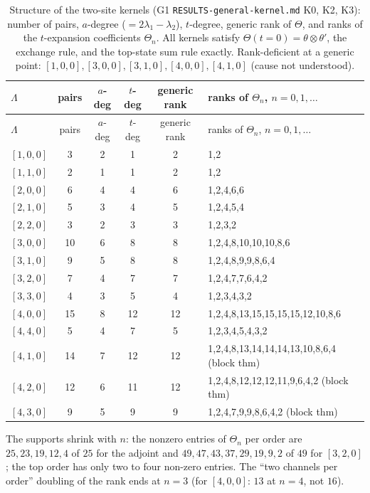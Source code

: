\documentclass[11pt]{article}
\begin{document}
{\footnotesize
\begin{longtable}{lccccl}
\caption{Structure of the two-site kernels (G1 \texttt{RESULTS-\allowbreak{}general-\allowbreak{}kernel.\allowbreak{}md} K0, K2, K3): number of pairs, $a$-degree ($=2\lambda_1-\lambda_2$), $t$-degree, generic rank of $\Theta$, and ranks of the $t$-expansion coefficients $\Theta_n$. All kernels satisfy $\Theta(t=0)=\theta\otimes\theta'$, the exchange rule, and the top-state sum rule exactly.
Rank-deficient at a generic point: $[1,0,0],[3,0,0],[3,1,0],[4,0,0],[4,1,0]$ (cause not understood).}\label{tab:kstruct}\\
\toprule
$\Lambda$ & pairs & $a$-deg & $t$-deg & generic rank & ranks of $\Theta_n$, $n=0,1,\dots$ \\
\midrule
\endfirsthead
\toprule
$\Lambda$ & pairs & $a$-deg & $t$-deg & generic rank & ranks of $\Theta_n$, $n=0,1,\dots$ \\
\midrule
\endhead
\bottomrule
\endlastfoot
$[1,0,0]$ & 3 & 2 & 1 & 2 & 1,2 \\
$[1,1,0]$ & 2 & 1 & 1 & 2 & 1,2 \\
$[2,0,0]$ & 6 & 4 & 4 & 6 & 1,2,4,6,6 \\
$[2,1,0]$ & 5 & 3 & 4 & 5 & 1,2,4,5,4 \\
$[2,2,0]$ & 3 & 2 & 3 & 3 & 1,2,3,2 \\
$[3,0,0]$ & 10 & 6 & 8 & 8 & 1,2,4,8,10,10,10,8,6 \\
$[3,1,0]$ & 9 & 5 & 8 & 8 & 1,2,4,8,9,9,8,6,4 \\
$[3,2,0]$ & 7 & 4 & 7 & 7 & 1,2,4,7,7,6,4,2 \\
$[3,3,0]$ & 4 & 3 & 5 & 4 & 1,2,3,4,3,2 \\
$[4,0,0]$ & 15 & 8 & 12 & 12 & 1,2,4,8,13,15,15,15,15,12,10,8,6 \\
$[4,4,0]$ & 5 & 4 & 7 & 5 & 1,2,3,4,5,4,3,2 \\
$[4,1,0]$ & 14 & 7 & 12 & 12 & 1,2,4,8,13,14,14,14,13,10,8,6,4 (block thm) \\
$[4,2,0]$ & 12 & 6 & 11 & 12 & 1,2,4,8,12,12,12,11,9,6,4,2 (block thm) \\
$[4,3,0]$ & 9 & 5 & 9 & 9 & 1,2,4,7,9,9,8,6,4,2 (block thm) \\
\end{longtable}}


The supports shrink with $n$: the nonzero entries of $\Theta_n$ per order are $25,23,19,12,4$ of $25$ for the adjoint and $49,47,43,37,29,19,9,2$ of $49$ for $[3,2,0]$; the top order has only two to four non-zero entries.
The ``two channels per order'' doubling of the rank ends at $n=3$ (for $[4,0,0]$: $13$ at $n=4$, not $16$).
\end{document}
